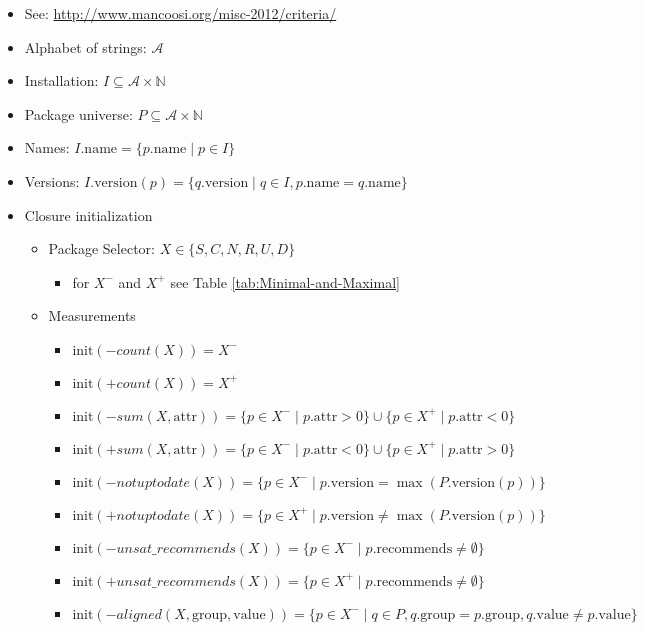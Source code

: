 \documentclass[a4paper,english]{article}
\begin{document}
\begin{itemize}
  \item See: \url{http://www.mancoosi.org/misc-2012/criteria/}
  \item Alphabet of strings: $\mathcal{A}$
  \item Installation: $I\subseteq\mathcal{A}\times\mathbb{N}$
  \item Package universe: $P\subseteq\mathcal{A}\times\mathbb{N}$ 
  \item Names: $I.\mathrm{name}=\{p.\mathrm{name}\mid p\in I\}$
  \item Versions: $I.\mathrm{version}(p)=\{q.\mathrm{version}\mid q\in I,p.\mathrm{name}=q.\mathrm{name}\}$
  \item Closure initialization
    \begin{itemize}
      \item Package Selector: $X\in\{S,C,N,R,U,D\}$
        \begin{itemize}
          \item for $X^{-}$ and $X^{+}$ see Table \ref{tab:Minimal-and-Maximal}
        \end{itemize}
      \item Measurements
        \begin{itemize}
          \item $\mathrm{init}({-}\mathit{count}(X))=X^{-}$
          \item $\mathrm{init}({+}\mathit{count}(X))=X^{+}$
          \item $\mathrm{init}({-}\mathit{sum}(X,\mathrm{attr}))=\{p\in X^{-}\mid p.\mathrm{attr}>0\}\cup\{p\in X^{+}\mid p.\mathrm{attr}<0\}$
          \item $\mathrm{init}({+}\mathit{sum}(X,\mathrm{attr}))=\{p\in X^{-}\mid p.\mathrm{attr}<0\}\cup\{p\in X^{+}\mid p.\mathrm{attr}>0\}$
          \item $\mathrm{init}({-}\mathit{notuptodate}(X))=\{p\in X^{-}\mid p.\mathrm{version}=\max(P.\mathrm{version}(p))\}$
          \item $\mathrm{init}({+}\mathit{notuptodate}(X))=\{p\in X^{+}\mid p.\mathrm{version}\not=\max(P.\mathrm{version}(p))\}$
          \item $\mathrm{init}({-}\mathit{unsat\_recommends}(X))=\{p\in X^{-}\mid p.\mathrm{recommends}\neq\emptyset\}$
          \item $\mathrm{init}({+}\mathit{unsat\_recommends}(X))=\{p\in X^{+}\mid p.\mathrm{recommends}\neq\emptyset\}$
          \item $\mathrm{init}({-}\mathit{aligned}(X,\mathrm{group},\mathrm{value}))=\{p\in X^{-}\mid q\in P, q.\mathrm{group} = p.\mathrm{group}, q.\mathrm{value} \neq p.\mathrm{value}\}$

\end{itemize}
\end{itemize}
\end{itemize}
\end{document}
